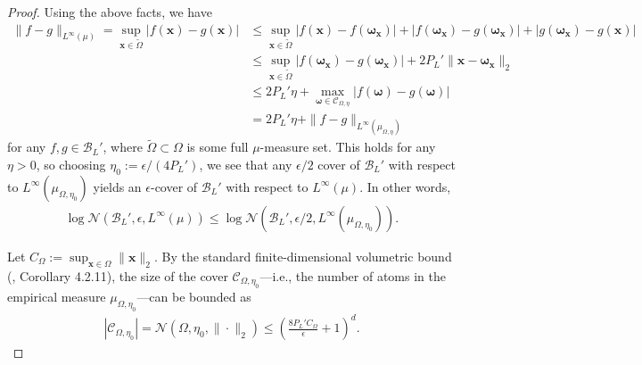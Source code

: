 \documentclass{article}
\def\vomega{{\bm{\omega}}}
\def\vx{{\bm{x}}}
\def\cB{{\mathcal{B}}}
\def\cC{{\mathcal{C}}}
\def\cN{{\mathcal{N}}}
\begin{document}
\begin{appendices}
\begin{proof}
    Using the above facts, we have
    \begin{align}
        \| f - g \|_{L^\infty(\mu)} = \sup_{\vx \in \widetilde{\Omega}} |f(\vx) - g(\vx)| &\leq \sup_{\vx \in \widetilde{\Omega}} |f(\vx) - f(\vomega_{\vx})| + |f(\vomega_{\vx}) - g(\vomega_{\vx})| + |g(\vomega_{\vx}) - g(\vx)| \\
        &\leq \sup_{\vx \in \widetilde{\Omega}} |f(\vomega_{\vx}) - g(\vomega_{\vx}) | + 2 P_L' \| \vx - \vomega_{\vx} \|_2 \\
        &\leq 2 P_L' \eta + \max_{\vomega \in \cC_{\Omega,\eta}} |f(\vomega) - g(\vomega)| \\
        &= 2 P_L' \eta+ \| f - g \|_{L^\infty(\mu_{\Omega, \eta})}
    \end{align}
    for any $f, g \in \cB_L'$, where $\widetilde{\Omega} \subset \Omega$ is some full $\mu$-measure set. This holds for any $\eta > 0$, so choosing $\eta_0 := \epsilon/(4 P_L')$, we see that any $\epsilon/2$ cover of $\cB_L'$ with respect to $L^\infty(\mu_{\Omega,\eta_0})$ yields an $\epsilon$-cover of $\cB_L'$ with respect to $L^\infty(\mu)$. In other words,
    \begin{align} \label{eq:infty_general_empirical_bound}
        \log \cN (\cB_L', \epsilon, L^\infty(\mu)) \leq \log \cN \left( \cB_L', \epsilon/2, L^\infty(\mu_{\Omega,\eta_0}) \right).
    \end{align}

    Let $C_{\Omega} := \sup_{\vx \in \Omega} \| \vx \|_2$. By the standard finite-dimensional volumetric bound (\cite{vershynin2020high}, Corollary 4.2.11), the size of the cover $\cC_{\Omega,\eta_0}$---i.e., the number of atoms in the empirical measure $\mu_{\Omega,\eta_0}$---can be bounded as
    \begin{align} \label{eq:C_omega_covering_bound}
        |\cC_{\Omega,\eta_0}| = \cN(\Omega, \eta_0, \| \cdot \|_2)  \leq \left( \frac{8 P_L' C_{\Omega}}{\epsilon}  + 1\right)^d.
    \end{align}


\end{proof}
\end{appendices}
\end{document}
